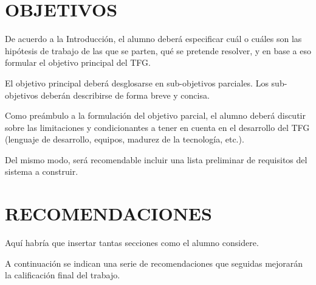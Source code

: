 \documentclass{pre-tfg}
\begin{document}
\section{OBJETIVOS}

De acuerdo a la Introducción, el alumno deberá especificar cuál o cuáles son las hipótesis
de trabajo de las que se parten, qué se pretende resolver, y en base a eso formular el
objetivo principal del TFG.

El objetivo principal deberá desglosarse en sub-objetivos parciales. Los sub-objetivos
deberán describirse de forma breve y concisa.

Como preámbulo a la formulación del objetivo parcial, el alumno deberá discutir sobre las
limitaciones y condicionantes a tener en cuenta en el desarrollo del TFG (lenguaje de
desarrollo, equipos, madurez de la tecnología, etc.).

Del mismo modo, será recomendable incluir una lista preliminar de requisitos del sistema a
construir.


\section{RECOMENDACIONES}

Aquí habría que insertar tantas secciones como el alumno considere.

A continuación se indican una serie de recomendaciones que seguidas mejorarán la calificación final del trabajo.
\end{document}
